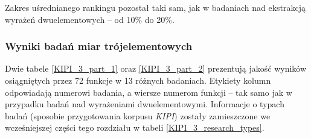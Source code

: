\par
Zakres uśrednianego rankingu pozostał taki sam, jak w badaniach nad ekstrakcją wyrażeń dwuelementowych -- od 10\% do 20\%.


\subsubsection{Wyniki badań miar trójelementowych}
Dwie tabele \ref{KIPI_3_part_1} oraz \ref{KIPI_3_part_2} prezentują jakość wyników osiągniętych przez 72 funkcje w 13 różnych badaniach.
Etykiety kolumn odpowiadają numerowi badania, a wiersze numerom funkcji -- tak samo jak w przypadku badań nad wyrażeniami dwuelementowymi.
Informacje o typach badań (sposobie przygotowania korpusu \emph{KIPI}) zostały zamieszczone we wcześniejszej części tego rozdziału w tabeli \ref{KIPI_3_research_types}.

